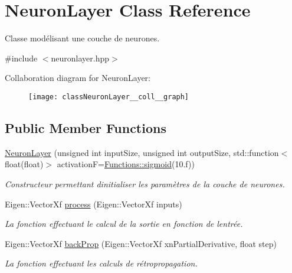 \hypertarget{classNeuronLayer}{}\section{Neuron\+Layer Class Reference}
\label{classNeuronLayer}


Classe modélisant une couche de neurones.  




{\ttfamily \#include $<$neuronlayer.\+hpp$>$}



Collaboration diagram for Neuron\+Layer\+:\nopagebreak
\begin{figure}[H]
\begin{center}
\leavevmode
\texttt{[image: classNeuronLayer\_\_coll\_\_graph]}
\end{center}
\end{figure}
\subsection*{Public Member Functions}
\begin{DoxyCompactItemize}
\item 
\hyperlink{classNeuronLayer_afe2804871685b8103d7cd461460e7b31}{Neuron\+Layer} (unsigned int input\+Size, unsigned int output\+Size, std\+::function$<$ float(float)$>$ activationF=\hyperlink{structFunctions_a773de9cd59f7ccc3e2fe9822f0536ae4}{Functions\+::sigmoid}(10.f))
\begin{DoxyCompactList}\small\item\em Constructeur permettant d\textquotesingle{}initialiser les paramètres de la couche de neurones. \end{DoxyCompactList}\item 
Eigen\+::\+Vector\+Xf \hyperlink{classNeuronLayer_aa374ba7d040ae618b5037aa88e5efae7}{process} (Eigen\+::\+Vector\+Xf inputs)
\begin{DoxyCompactList}\small\item\em La fonction effectuant le calcul de la sortie en fonction de l\textquotesingle{}entrée. \end{DoxyCompactList}\item 
Eigen\+::\+Vector\+Xf \hyperlink{classNeuronLayer_a0896580aa265681f77efbcb81c6c8150}{back\+Prop} (Eigen\+::\+Vector\+Xf xn\+Partial\+Derivative, float step)
\begin{DoxyCompactList}\small\item\em La fonction effectuant les calculs de rétropropagation. \end{DoxyCompactList}\end{DoxyCompactItemize}
